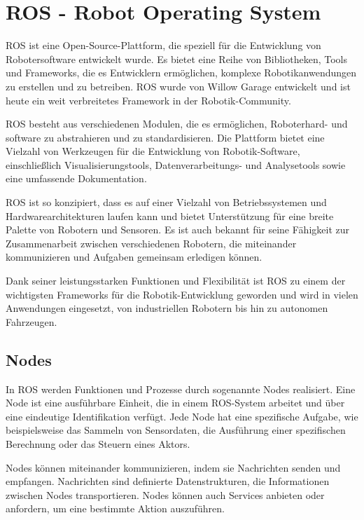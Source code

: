 \section{ROS - Robot Operating System} \label{ros:section}
\ac{ROS} ist eine Open-Source-Plattform, die speziell für die Entwicklung von Robotersoftware entwickelt wurde. Es bietet eine Reihe von Bibliotheken, Tools und Frameworks, die es Entwicklern ermöglichen, komplexe Robotikanwendungen zu erstellen und zu betreiben. \ac{ROS} wurde von Willow Garage entwickelt und ist heute ein weit verbreitetes Framework in der Robotik-Community.

\ac{ROS} besteht aus verschiedenen Modulen, die es ermöglichen, Roboterhard-  und software zu abstrahieren und zu standardisieren. Die Plattform bietet eine Vielzahl von Werkzeugen für die Entwicklung von Robotik-Software, einschließlich Visualisierungstools, Datenverarbeitungs- und Analysetools sowie eine umfassende Dokumentation.

\ac{ROS} ist so konzipiert, dass es auf einer Vielzahl von Betriebssystemen und Hardwarearchitekturen laufen kann und bietet Unterstützung für eine breite Palette von Robotern und Sensoren. Es ist auch bekannt für seine Fähigkeit zur Zusammenarbeit zwischen verschiedenen Robotern, die miteinander kommunizieren und Aufgaben gemeinsam erledigen können.

Dank seiner leistungsstarken Funktionen und Flexibilität ist \ac{ROS} zu einem der wichtigsten Frameworks für die Robotik-Entwicklung geworden und wird in vielen Anwendungen eingesetzt, von industriellen Robotern bis hin zu autonomen Fahrzeugen.

    \subsection{Nodes} \label{nodes:subsection}
    In \ac{ROS} werden Funktionen und Prozesse durch sogenannte Nodes realisiert. Eine Node ist eine ausführbare Einheit, die in einem \ac{ROS}-System arbeitet und über eine eindeutige Identifikation verfügt. Jede Node hat eine spezifische Aufgabe, wie beispielsweise das Sammeln von Sensordaten, die Ausführung einer spezifischen Berechnung oder das Steuern eines Aktors.

    Nodes können miteinander kommunizieren, indem sie Nachrichten senden und empfangen. Nachrichten sind definierte Datenstrukturen, die Informationen zwischen Nodes transportieren. Nodes können auch Services anbieten oder anfordern, um eine bestimmte Aktion auszuführen.

